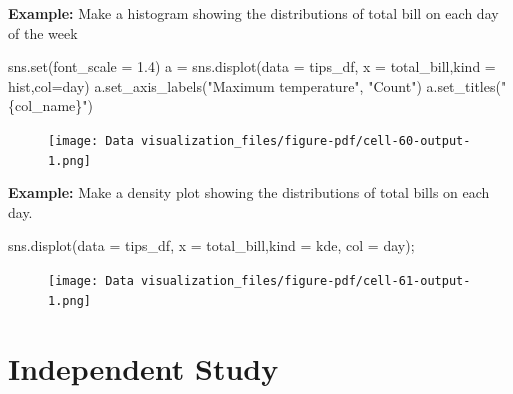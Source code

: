 \documentclass[
  letterpaper,
  DIV=11,
  numbers=noendperiod]{scrreprt}
\newenvironment{Shaded}{\begin{snugshade}}{\end{snugshade}}
\newcommand{\BuiltInTok}[1]{\textcolor[rgb]{0.00,0.23,0.31}{#1}}
\newcommand{\FloatTok}[1]{\textcolor[rgb]{0.68,0.00,0.00}{#1}}
\newcommand{\NormalTok}[1]{\textcolor[rgb]{0.00,0.23,0.31}{#1}}
\newcommand{\OperatorTok}[1]{\textcolor[rgb]{0.37,0.37,0.37}{#1}}
\newcommand{\SpecialCharTok}[1]{\textcolor[rgb]{0.37,0.37,0.37}{#1}}
\newcommand{\StringTok}[1]{\textcolor[rgb]{0.13,0.47,0.30}{#1}}
\begin{document}
\textbf{Example:} Make a histogram showing the distributions of total
bill on each day of the week

\begin{Shaded}
\begin{Highlighting}[]
\NormalTok{sns.}\BuiltInTok{set}\NormalTok{(font\_scale }\OperatorTok{=} \FloatTok{1.4}\NormalTok{)}
\NormalTok{a }\OperatorTok{=}\NormalTok{ sns.displot(data }\OperatorTok{=}\NormalTok{ tips\_df, x }\OperatorTok{=} \StringTok{\textquotesingle{}total\_bill\textquotesingle{}}\NormalTok{,kind }\OperatorTok{=} \StringTok{\textquotesingle{}hist\textquotesingle{}}\NormalTok{,col}\OperatorTok{=}\StringTok{\textquotesingle{}day\textquotesingle{}}\NormalTok{)}
\NormalTok{a.set\_axis\_labels(}\StringTok{"Maximum temperature"}\NormalTok{, }\StringTok{"Count"}\NormalTok{)}
\NormalTok{a.set\_titles(}\StringTok{"}\SpecialCharTok{\{col\_name\}}\StringTok{"}\NormalTok{)}
\end{Highlighting}
\end{Shaded}

\begin{figure}[H]

{\centering \texttt{[image: Data visualization\_files/figure-pdf/cell-60-output-1.png]}

}

\end{figure}

\textbf{Example:} Make a density plot showing the distributions of total
bills on each day.

\begin{Shaded}
\begin{Highlighting}[]
\NormalTok{sns.displot(data }\OperatorTok{=}\NormalTok{ tips\_df, x }\OperatorTok{=} \StringTok{\textquotesingle{}total\_bill\textquotesingle{}}\NormalTok{,kind }\OperatorTok{=} \StringTok{\textquotesingle{}kde\textquotesingle{}}\NormalTok{, col }\OperatorTok{=} \StringTok{\textquotesingle{}day\textquotesingle{}}\NormalTok{)}\OperatorTok{;}
\end{Highlighting}
\end{Shaded}

\begin{figure}[H]

{\centering \texttt{[image: Data visualization\_files/figure-pdf/cell-61-output-1.png]}

}

\end{figure}

\hypertarget{independent-study}{%
\section{Independent Study}\label{independent-study}}
\end{document}
